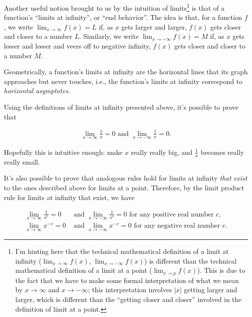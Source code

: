 \documentclass{article}
\begin{document}
Another useful notion brought to us by the intuition of limits\footnote{I'm hinting here that the technical mathematical definition of a limit at infinity ($\lim_{x \rightarrow \infty} f(x)$, $\lim_{x \rightarrow -\infty} f(x)$) is different than the technical mathematical definition of a limit at a point ($\lim_{x \rightarrow p} f(x)$). This is due to the fact that we have to make some formal interpretation of what we mean by $x \rightarrow \infty$ and $x \rightarrow -\infty$; this interpretation involves $|x|$ getting larger and larger, which is different than the ``getting closer and closer'' involved in the definition of limit at a point.} is that of a function's ``limits at infinity'', or ``end behavior''. The idea is that, for a function $f$, we write $\lim_{x \rightarrow \infty} f(x) = L$ if, as $x$ gets larger and larger, $f(x)$ gets closer and closer to a number $L$. Similarly, we write $\lim_{x \rightarrow -\infty} f(x) = M$ if, as $x$ gets lesser and lesser and veers off to negative infinity, $f(x)$ gets closer and closer to a number $M$. 

Geometrically, a function's limits at infinity are the horizontal lines that its graph approaches but never touches, i.e., the function's limits at infinity correspond to \textit{horizontal asymptotes}.

Using the definitions of limits at infinity presented above, it's possible to prove that

\begin{align*}
    \lim_{x \rightarrow \infty} \frac{1}{x} = 0 \text{ and } \lim_{x \rightarrow -\infty} \frac{1}{x} = 0. 
\end{align*}

Hopefully this is intuitive enough: make $x$ really really big, and $\frac{1}{x}$ becomes really really small.

It's also possible to prove that analogous rules hold for limits at infinity \textit{that exist} to the ones described above for limits at a point. Therefore, by the limit product rule for limits at infinity that exist, we have

\begin{align*}
    \lim_{x \rightarrow \infty} \frac{1}{x^c} = 0 &\text{ and } \lim_{x \rightarrow -\infty} \frac{1}{x^c} = 0 \text{ for any positive real number $c$}, \\
    \lim_{x \rightarrow \infty} x^{-c} = 0 &\text{ and } \lim_{x \rightarrow -\infty} x^{-c} = 0 \text{ for any negative real number $c$}.
\end{align*}
\end{document}

